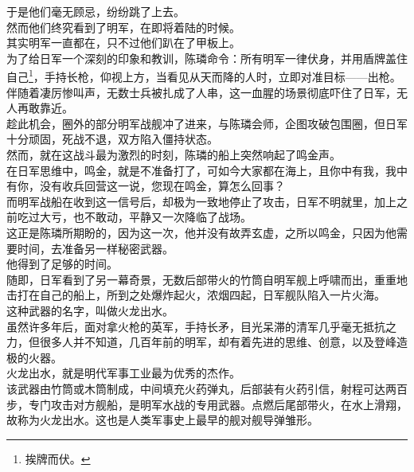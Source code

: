 \begin{multicols}{\theparacolNo}
于是他们毫无顾忌，纷纷跳了上去。\\

然而他们终究看到了明军，在即将着陆的时候。\\

其实明军一直都在，只不过他们趴在了甲板上。\\

为了给日军一个深刻的印象和教训，陈璘命令：所有明军一律伏身，并用盾牌盖住自己\footnote{挨牌而伏。}，手持长枪，仰视上方，当看见从天而降的人时，立即对准目标——出枪。\\

伴随着凄厉惨叫声，无数士兵被扎成了人串，这一血腥的场景彻底吓住了日军，无人再敢靠近。\\

趁此机会，圈外的部分明军战舰冲了进来，与陈璘会师，企图攻破包围圈，但日军十分顽固，死战不退，双方陷入僵持状态。\\

然而，就在这战斗最为激烈的时刻，陈璘的船上突然响起了鸣金声。\\

在日军思维中，鸣金，就是不准备打了，可如今大家都在海上，且你中有我，我中有你，没有收兵回营这一说，您现在鸣金，算怎么回事？\\

而明军战船在收到这一信号后，却极为一致地停止了攻击，日军不明就里，加上之前吃过大亏，也不敢动，平静又一次降临了战场。\\

这正是陈璘所期盼的，因为这一次，他并没有故弄玄虚，之所以鸣金，只因为他需要时间，去准备另一样秘密武器。\\

他得到了足够的时间。\\

随即，日军看到了另一幕奇景，无数后部带火的竹筒自明军舰上呼啸而出，重重地击打在自己的船上，所到之处爆炸起火，浓烟四起，日军舰队陷入一片火海。\\

这种武器的名字，叫做火龙出水。\\

虽然许多年后，面对拿火枪的英军，手持长矛，目光呆滞的清军几乎毫无抵抗之力，但很多人并不知道，几百年前的明军，却有着先进的思维、创意，以及登峰造极的火器。\\

火龙出水，就是明代军事工业最为优秀的杰作。\\

该武器由竹筒或木筒制成，中间填充火药弹丸，后部装有火药引信，射程可达两百步，专门攻击对方舰船，是明军水战的专用武器。点燃后尾部带火，在水上滑翔，故称为火龙出水。这也是人类军事史上最早的舰对舰导弹雏形。\\


\end{multicols}
